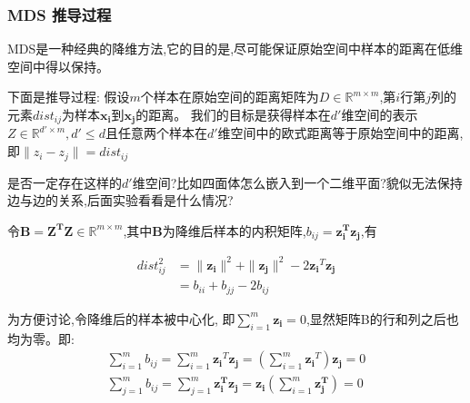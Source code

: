 \documentclass[UTF8,a4paper]{ctexart}%
\begin{document}
              {\color{blue}{ 根据上面的说法,最简单的降维思路,就是人工把不需要的属性去掉,只取认为有用的属性进行学习 }}

              {\color{red}{ 但是,大部分情况我们并不知道哪些属性,后面的算法中,根据什么东西来选择哪些属性,这样选择的意义在哪里,为什么这么选择能得到需要的低维样本,需要进一步的思考 }}

          \subsubsection{MDS 推导过程}
              MDS是一种经典的降维方法,它的目的是,尽可能保证原始空间中样本的距离在低维空间中得以保持。{\color{blue}{也就是说,样本"投影"到低维空间之后,样本之间的距离尽可能地保持一样。}}

              下面是推导过程:
              假设$m$个样本在原始空间的距离矩阵为$D\in \mathbb{R}^{m\times m}$,第$i$行第$j$列的元素$dist_{ij}$为样本$\mathbf{x_i}$到$\mathbf{x_j}$的距离。
              我们的目标是获得样本在$d'$维空间的表示$Z\in \mathbb{R}^{d'\times m} , d' \leqslant d$且任意两个样本在$d'$维空间中的欧式距离等于原始空间中的距离,即$\|z_i - z_j\| = dist_{ij}$

              {\color{red}
                是否一定存在这样的$d'$维空间?比如四面体怎么嵌入到一个二维平面?貌似无法保持边与边的关系,后面实验看看是什么情况?
              }

              令$\mathbf{B = Z^TZ} \in \mathbb{R}^{m\times m}$,其中$\mathbf{B}$为降维后样本的内积矩阵,$b_{ij} = \mathbf{z_i^Tz_j}$,有

              \begin{align}
                dist_{ij}^2 &= \|\mathbf{z_i}\|^2 + \|\mathbf{z_j}\|^2 - 2\mathbf{z_i}^T\mathbf{z_j}  \\
                          &= b_{ii} + b_{jj} - 2b_{ij}
                \label{distijbiibjj2bij}
              \end{align}


              为方便讨论,令降维后的样本被中心化, 即$\sum_{i = 1}^m \mathbf{z_i} = 0$,显然矩阵B的行和列之后也均为零。即:
              \begin{align}
                \sum_{i = 1}^m b_{ij} = \sum_{i = 1}^m \mathbf{z_i}^T\mathbf{z_j} = \left ( \sum_{i = 1}^m \mathbf{z_i}^T \right)\mathbf{z_j} = 0\\
                \sum_{j = 1}^m b_{ij} = \sum_{j = 1}^m \mathbf{z_i^Tz_j} = \mathbf{z_i}\left ( \sum_{i = 1}^m \mathbf{z_j^T} \right) = 0
              \end{align}
\end{document}
